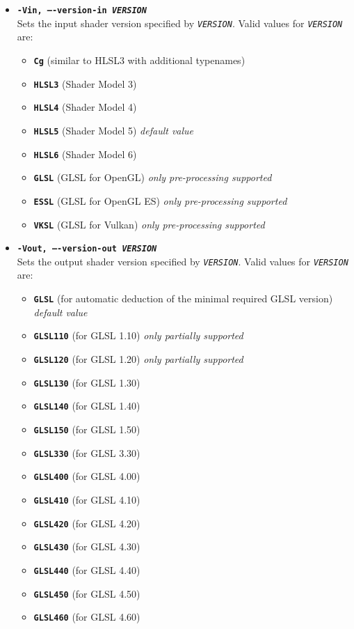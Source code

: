 \documentclass{article}
\begin{document}
\begin{itemize}
	\item[] \textbf{\texttt{-Vin, ----version-in \textit{VERSION}}} \\
	Sets the input shader version specified by \texttt{\textit{VERSION}}.
	Valid values for \texttt{\textit{VERSION}} are:
	\begin{itemize}
		\item[] \textbf{\texttt{Cg}} (similar to HLSL3 with additional typenames)
		\item[] \textbf{\texttt{HLSL3}} (Shader Model 3)
		\item[] \textbf{\texttt{HLSL4}} (Shader Model 4)
		\item[] \textbf{\texttt{HLSL5}} (Shader Model 5) \textit{default value}
		\item[] \textbf{\texttt{HLSL6}} (Shader Model 6)
		\item[] \textbf{\texttt{GLSL}} (GLSL for OpenGL) \textit{only pre-processing supported}
		\item[] \textbf{\texttt{ESSL}} (GLSL for OpenGL ES) \textit{only pre-processing supported}
		\item[] \textbf{\texttt{VKSL}} (GLSL for Vulkan) \textit{only pre-processing supported}
	\end{itemize}
	
	\item[] \textbf{\texttt{-Vout, ----version-out \textit{VERSION}}} \\
	Sets the output shader version specified by \texttt{\textit{VERSION}}.
	Valid values for \texttt{\textit{VERSION}} are:
	\begin{itemize}
		\item[] \textbf{\texttt{GLSL}} (for automatic deduction of the minimal required GLSL version) \textit{default value}
		\item[] \textbf{\texttt{GLSL110}} (for GLSL 1.10) \textit{only partially supported}
		\item[] \textbf{\texttt{GLSL120}} (for GLSL 1.20) \textit{only partially supported}
		\item[] \textbf{\texttt{GLSL130}} (for GLSL 1.30)
		\item[] \textbf{\texttt{GLSL140}} (for GLSL 1.40)
		\item[] \textbf{\texttt{GLSL150}} (for GLSL 1.50)
		\item[] \textbf{\texttt{GLSL330}} (for GLSL 3.30)
		\item[] \textbf{\texttt{GLSL400}} (for GLSL 4.00)
		\item[] \textbf{\texttt{GLSL410}} (for GLSL 4.10)
		\item[] \textbf{\texttt{GLSL420}} (for GLSL 4.20)
		\item[] \textbf{\texttt{GLSL430}} (for GLSL 4.30)
		\item[] \textbf{\texttt{GLSL440}} (for GLSL 4.40)
		\item[] \textbf{\texttt{GLSL450}} (for GLSL 4.50)
		\item[] \textbf{\texttt{GLSL460}} (for GLSL 4.60)
	\end{itemize}
	
\end{itemize}
\end{document}
